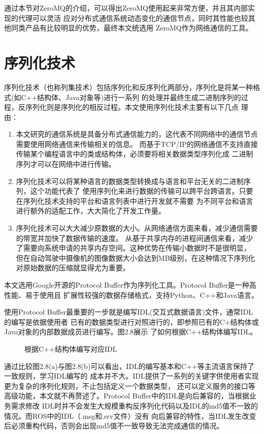 通过本节对ZeroMQ的介绍，可以得出ZeroMQ使用起来非常方便，并且其内部实现的代理可以灵活
应对分布式通信系统动态变化的通信节点，同时其性能也较其他同类产品有比较明显的优势，最终本文统选用
ZeroMQ作为网络通信的工具。

\section{序列化技术}
序列化技术（也称列集技术）包括序列化和反序列化两部分，序列化是将某一种格式(如C++结构体、Java对象等)进行一系列
的处理并最终生成二进制序列的过程，反序列化则是序列化的相反过程\cite{zj,wangbinbin}。本文使用序列化技术主要有以下几点
理由：
\begin{enumerate}
  \item 本文研究的通信系统是具备分布式通信能力的，这代表不同网络中的通信节点需要使用网络通信来传输相关的信息。
  而基于TCP/IP的网络通信不支持直接传输某个编程语言中的类或结构体，必须要将相关数据类型序列化成
  二进制序列才可以在网络中进行传输。
  \item 序列化技术可以将某种语言的数据类型转换成与语言和平台无关的二进制序列，这个功能代表了
  使用序列化来进行数据的传输可以跨平台跨语言。只要在序列化技术支持的平台和语言列表中进行开发就不需要
  为不同平台和语言进行额外的适配工作，大大简化了开发工作量。
  \item 序列化技术可以大大减少原数据的大小。从网络通信方面来看，减少通信需要的带宽并加快了数据传输的速度。
  从基于共享内存的进程间通信来看，减少了需要向系统申请的共享内存空间。这种优势在传输小数据时不是很明显，
  但在自动驾驶中摄像机的图像数据大小会达到MB级别，在这种情况下序列化对原始数据的压缩就显得尤为重要。
\end{enumerate}
本文选用Google开源的Protocol Buffer作为序列化工具。Protocol Buffer是一种高性能、易于使用且
扩展性较强的数据存储格式，支持Python、C++和Java语言\cite{sxy}。

使用Protocol Buffer最重要的一步就是编写IDL(交互式数据语言)文件，通常IDL的编写是依据使用者
已有的数据类型进行对照进行的，即参照已有的C+结构体或Java对象的内部数据成员进行编写。图2.8展示
了如何根据C++结构体编写IDL。
\begin{figure}[H]
  \centering
  \caption{根据C++结构体编写对应IDL}
  \label{Fig.11}
\end{figure}
通过比较图2.8(a)与图2.8(b)可以看出，IDL的编写基本和C++等主流语言保持了一致规则，学习IDL编写的
成本并不大。IDL提供了一系列的关键字供使用者实现更为复杂的序列化规则，不止包括定义一个数据类型，
还可以定义服务的接口等高级功能，本文就不再赘述了。Protocol Buffer中的IDL是向后兼容的，当根据业务需求修改
IDL时并不会发生大规模重构反序列化代码以及IDL的md5值不一致的情况。而ROS中的IDL（.msg和.srv文件）没有
向后兼容的特性，当IDL发生改变后必须重构代码，否则会出现md5值不一致导致无法完成通信的情况。

